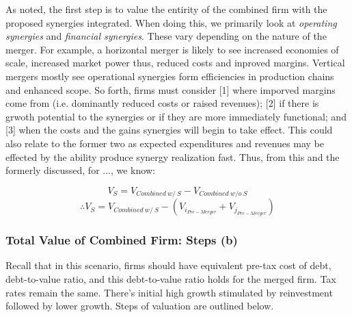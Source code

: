 \documentclass[11pt, english]{article}
\begin{document}
        As noted, the first step is to value the entirity of the combined firm with the proposed synergies integrated. When doing this, we primarily look at \textit{operating synergies} and \textit{financial synergies}. These vary depending on the nature of the merger. For example, a horizontal merger is likely to see increased economies of scale, increased market power thus, reduced costs and inproved margins. Vertical mergers mostly see operational synergies form efficiencies in production chains and enhanced scope. So forth, firms must consider [1] where imporved margins come from (i.e. dominantly reduced costs or raised revenues); [2] if there is grwoth potential to the synergies or if they are more immediately functional; and [3] when the costs and the gains synergies will begin to take effect. This could also relate to the former two as expected expenditures and revenues may be effected by the ability produce synergy realization fast. Thus, from this and the formerly discussed, for ..., we know:

        $$V_S=V_{Combined\ w/\ S}-V_{Combined\ w/o\ S}$$
        $$\therefore V_S=V_{Combined\ w/\ S}-(V_{i_{Pre-Merger}}+V_{j_{Pre-Merger}})$$

                \subsubsection*{Total Value of Combined Firm: Steps (b)}

        Recall that in this scenario, firms should have equivalent pre-tax cost of debt, debt-to-value ratio, and this debt-to-value ratio holds for the merged firm. Tax rates remain the same. There's initial high growth stimulated by reinvestment followed by lower growth. Steps of valuation are outlined below.
\end{document}

